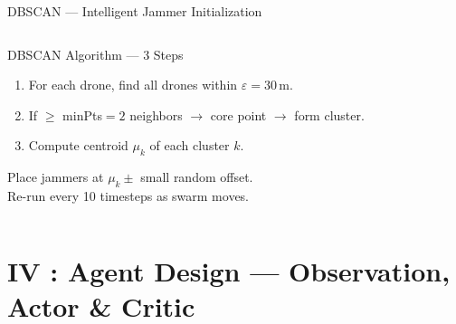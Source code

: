 \documentclass[10pt, aspectratio=169]{beamer}
\begin{document}
\begin{frame}{DBSCAN --- Intelligent Jammer Initialization}
\begin{columns}[T,onlytextwidth]
\vspace{0cm}
\begin{exampleblock}{\small DBSCAN Algorithm --- 3 Steps}
  \footnotesize
  \begin{enumerate}
    \item For each drone, find all drones within $\varepsilon = 30\,$m.
    \item If $\geq$ minPts$=2$ neighbors $\to$ core point $\to$ form cluster.
    \item Compute centroid $\mu_k$ of each cluster $k$.
  \end{enumerate}
  \vspace{0.05cm}
  Place jammers at $\mu_k \pm$ small random offset.\\
  Re-run every 10 timesteps as swarm moves.
\end{exampleblock}
\end{columns}
\end{frame}

\section{IV : Agent Design --- Observation, Actor \& Critic}\label{sec:agents}
\end{document}
